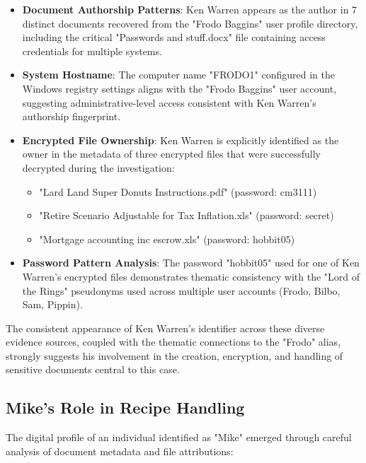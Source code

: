 \begin{itemize}
    \item \textbf{Document Authorship Patterns}: Ken Warren appears as the author in 7 distinct documents recovered from the "Frodo Baggins" user profile directory, including the critical "Passwords and stuff.docx" file containing access credentials for multiple systems.
    
    \item \textbf{System Hostname}: The computer name "FRODO1" configured in the Windows registry settings aligns with the "Frodo Baggins" user account, suggesting administrative-level access consistent with Ken Warren's authorship fingerprint.
    
    \item \textbf{Encrypted File Ownership}: Ken Warren is explicitly identified as the owner in the metadata of three encrypted files that were successfully decrypted during the investigation:
    \begin{itemize}
        \item "Lard Land Super Donuts Instructions.pdf" (password: cm3111)
        \item "Retire Scenario Adjustable for Tax Inflation.xls" (password: secret)
        \item "Mortgage accounting inc escrow.xls" (password: hobbit05)
    \end{itemize}
    
    \item \textbf{Password Pattern Analysis}: The password "hobbit05" used for one of Ken Warren's encrypted files demonstrates thematic consistency with the "Lord of the Rings" pseudonyms used across multiple user accounts (Frodo, Bilbo, Sam, Pippin).
\end{itemize}

The consistent appearance of Ken Warren's identifier across these diverse evidence sources, coupled with the thematic connections to the "Frodo" alias, strongly suggests his involvement in the creation, encryption, and handling of sensitive documents central to this case.

\subsection{Mike's Role in Recipe Handling}
The digital profile of an individual identified as "Mike" emerged through careful analysis of document metadata and file attributions:


